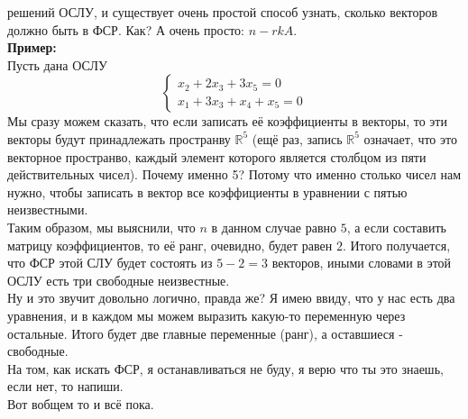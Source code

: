 \documentclass[a4paper,11pt]{report}
\begin{document}
решений ОСЛУ, и существует очень простой способ узнать, сколько векторов должно быть в ФСР. Как? А очень просто: $n - rkA$.\\
\textbf{Пример:}\\
Пусть дана ОСЛУ
\[
\begin{cases}
x_2 + 2x_3 + 3x_5 = 0\\
x_1 + 3x_3 + x_4 + x_5 = 0
\end{cases}
\]
Мы сразу можем сказать, что если записать её коэффициенты в векторы, то эти векторы будут принадлежать пространву $\mathbb{R}^5$ 
(ещё раз, запись $\mathbb{R}^5$ означает, что это векторное пространво, каждый элемент которого является столбцом из пяти действительных чисел).
Почему именно 5? Потому что именно столько чисел нам нужно, чтобы записать в вектор все коэффициенты в уравнении с пятью неизвестными.\\
Таким образом, мы выяснили, что $n$ в данном случае равно $5$, а если составить матрицу коэффициентов, то её ранг, очевидно, будет равен $2$.
Итого получается, что ФСР этой СЛУ будет состоять из $5 - 2 = 3$ векторов, иными словами в этой ОСЛУ есть три свободные неизвестные.\\
Ну и это звучит довольно логично, правда же? Я имею ввиду, что у нас есть два уравнения, и в каждом мы можем выразить какую-то переменную
через остальные. Итого будет две главные переменные (ранг), а оставшиеся - свободные.\\
На том, как искать ФСР, я останавливаться не буду, я верю что ты это знаешь, если нет, то напиши.\\
Вот вобщем то и всё пока.\\
\\
\end{document}
